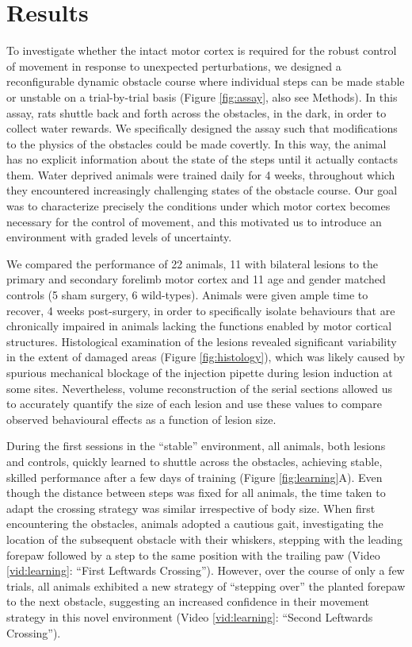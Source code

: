 \section{Results}

To investigate whether the intact motor cortex is required for the robust control of movement in response to unexpected perturbations, we designed a reconfigurable dynamic obstacle course where individual steps can be made stable or unstable on a trial-by-trial basis (Figure \ref{fig:assay}, also see Methods). In this assay, rats shuttle back and forth across the obstacles, in the dark, in order to collect water rewards. We specifically designed the assay such that modifications to the physics of the obstacles could be made covertly. In this way, the animal has no explicit information about the state of the steps until it actually contacts them. Water deprived animals were trained daily for 4 weeks, throughout which they encountered increasingly challenging states of the obstacle course. Our goal was to characterize precisely the conditions under which motor cortex becomes necessary for the control of movement, and this motivated us to introduce an environment with graded levels of uncertainty.

We compared the performance of 22 animals, 11 with bilateral lesions to the primary and secondary forelimb motor cortex and 11 age and gender matched controls (5 sham surgery, 6 wild-types). Animals were given ample time to recover, 4 weeks post-surgery, in order to specifically isolate behaviours that are chronically impaired in animals lacking the functions enabled by motor cortical structures. Histological examination of the lesions revealed significant variability in the extent of damaged areas (Figure \ref{fig:histology}), which was likely caused by spurious mechanical blockage of the injection pipette during lesion induction at some sites. Nevertheless, volume reconstruction of the serial sections allowed us to accurately quantify the size of each lesion and use these values to compare observed behavioural effects as a function of lesion size.

During the first sessions in the ``stable'' environment, all animals, both lesions and controls, quickly learned to shuttle across the obstacles, achieving stable, skilled performance after a few days of training (Figure \ref{fig:learning}A). Even though the distance between steps was fixed for all animals, the time taken to adapt the crossing strategy was similar irrespective of body size. When first encountering the obstacles, animals adopted a cautious gait, investigating the location of the subsequent obstacle with their whiskers, stepping with the leading forepaw followed by a step to the same position with the trailing paw (Video \ref{vid:learning}: ``First Leftwards Crossing''). However, over the course of only a few trials, all animals exhibited a new strategy of ``stepping over'' the planted forepaw to the next obstacle, suggesting an increased confidence in their movement strategy in this novel environment (Video \ref{vid:learning}: ``Second Leftwards Crossing'').

